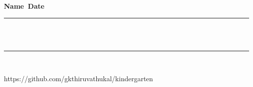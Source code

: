 \documentclass[10pt,landscape,letterpaper]{article}
\begin{document}
{\bf Name\ \underline{\hskip 200pt}\hskip 200pt}{\bf Date\
\underline{\hskip 150pt}}

\vskip 1cm

{
\vskip 10pt
\rule[1.75ex]{10in}{1pt}
\\
\hdashrule{10.25in}{1pt}{4mm}
\\
\rule[-1.75ex]{10in}{1pt}
\\
}

\vskip 1cm

https://github.com/gkthiruvathukal/kindergarten
\end{document}
